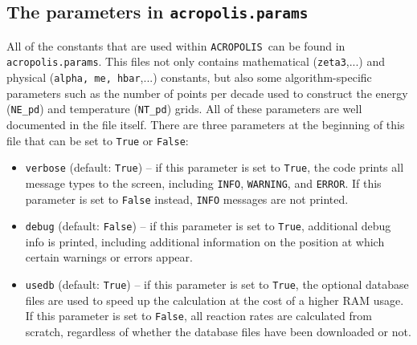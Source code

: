 \documentclass[11pt,a4paper]{article}
\newcommand{\acropolis}{\texttt{ACROPOLIS}~}
\begin{document}
\subsection{The parameters in \texttt{acropolis.params}}
\label{sec:params}
All of the constants that are used within \acropolis can be found in \texttt{acropolis.params}. This files not only contains mathematical (\texttt{zeta3},...) and physical (\texttt{alpha, me, hbar},...) constants, but also some algorithm-specific parameters such as the number of points per decade used to construct the energy (\texttt{NE\_pd}) and temperature (\texttt{NT\_pd}) grids. All of these parameters are well documented in the file itself.
There are three parameters at the beginning of this file that can be set to \texttt{True} or \texttt{False}:
\begin{itemize}
	\item \texttt{verbose} (default: \texttt{True}) -- if this parameter is set to \texttt{True}, the code prints all message types to the screen, including \texttt{INFO}, \texttt{WARNING}, and \texttt{ERROR}. If this parameter is set to \texttt{False} instead, \texttt{INFO} messages are not printed.
	\item \texttt{debug} (default: \texttt{False}) -- if this parameter is set to \texttt{True}, additional debug info is printed, including additional information on the position at which certain warnings or errors appear.
	\item \texttt{usedb} (default: \texttt{True}) -- if this parameter is set to \texttt{True}, the optional database files are used to speed up the calculation at the cost of a higher RAM usage. If this parameter is set to \texttt{False}, all reaction rates are calculated from scratch, regardless of whether the database files have been downloaded or not.
\end{itemize}
\end{document}
